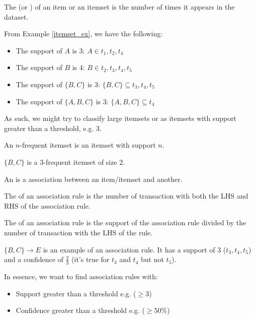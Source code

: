 \documentclass[../main/main.tex]{subfiles}
\begin{document}
\begin{definition}
	The  (or ) of an item or an itemset is the number of times it appears in the dataset.
\end{definition}
\begin{example}
	From Example \ref{itemset_ex}, we have the following:
	\begin{itemize}
		\item The support of $A$ is 3:  $A \in t_1,t_2,t_4$
		\item The support of $B$ is 4: $B \in t_2,t_3,t_4,t_5$
		\item The support of $\{B,C\} $ is 3: $\{B,C\} \subseteq t_3,t_4,t_5$
		\item The support of $\{A,B,C\} $ is 3: $\{A,B,C\} \subseteq t_4$
	\end{itemize}
\end{example}
As such, we might try to classify large itemsets or  as itemsets with support greater than a threshold, e.g. 3.
\begin{definition}
	An $n$-frequent itemset is an itemset with support $n$.
\end{definition}
\begin{example}
	$\{B,C\} $ is a $3$-frequent itemset of size $2$.
\end{example}
\begin{definition}
	An  is a association between an item/itemset and another.
\end{definition}
\begin{definition}
	The  of an association rule is the number of transaction with both the LHS and RHS of the association rule.
\end{definition}
\begin{definition}
	The  of an association rule is the support of the association rule divided by the number of transaction with the LHS of the rule.
\end{definition}
\begin{example}
	$\{B,C\} \to E$ is an example of an association rule. It has a support of 3 ($t_3,t_4,t_5$) and a confidence of $\frac{2}{3}$ (it's true for $t_3$ and $t_4$ but not $t_5$).
\end{example}
In essence, we want to find association rules with:
\begin{itemize}
	\item Support greater than a threshold e.g. ($\ge 3$)
	\item Confidence greater than a threshold e.g. ($\ge 50\%$)
\end{itemize}
\end{document}

